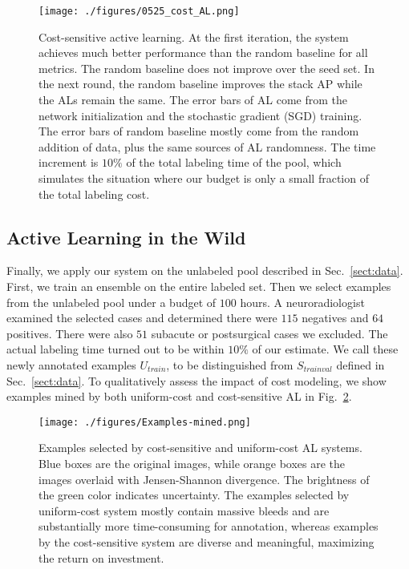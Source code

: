 \documentclass{llncs}
\begin{document}
\begin{figure}[t]
    \centering
    \texttt{[image: ./figures/0525\_cost\_AL.png]}
    \vspace*{-0.3cm}
    \caption{Cost-sensitive active learning. At the first iteration, the system achieves much better performance than the random baseline for all metrics. The random baseline does not improve over the seed set. In the next round, the random baseline improves the stack AP while the ALs remain the same. The error bars of AL come from the network initialization and the stochastic gradient (SGD) training. The error bars of random baseline mostly come from the random addition of data, plus the same sources of AL randomness. The time increment is $10\%$ of the total labeling time of the pool, which simulates the situation where our budget is only a small fraction of the total labeling cost.}
    \label{fig:cost-sensitive}
    \vspace*{-0.05cm}
\end{figure}

\subsection{Active Learning in the Wild}
\vspace*{-0.05cm}

Finally, we apply our system on the unlabeled pool described in Sec.~\ref{sect:data}. First, we train an ensemble on the entire labeled set. Then we select examples from the unlabeled pool under a budget of $100$ hours. A neuroradiologist examined the selected cases and determined there were $115$ negatives and $64$ positives. There were also $51$ subacute or postsurgical cases we excluded. The actual labeling time turned out to be within $10\%$ of our estimate. We call these newly annotated examples $U_{train}$, to be distinguished from $S_{trainval}$ defined in Sec.~\ref{sect:data}. To qualitatively assess the impact of cost modeling, we show examples mined by both uniform-cost and cost-sensitive AL in Fig.~\ref{fig:examples-mined}.

\begin{figure}[t]
    \centering
    \texttt{[image: ./figures/Examples-mined.png]}
    \caption{Examples selected by cost-sensitive and uniform-cost AL systems. Blue boxes are the original images, while orange boxes are the images overlaid with Jensen-Shannon divergence. The brightness of the green color indicates uncertainty. The examples selected by uniform-cost system mostly contain massive bleeds and are substantially more time-consuming for annotation, whereas examples by the cost-sensitive system are diverse and meaningful, maximizing the return on investment.}
    \label{fig:examples-mined}
    \vspace*{-0.5cm}
\end{figure}
\end{document}
